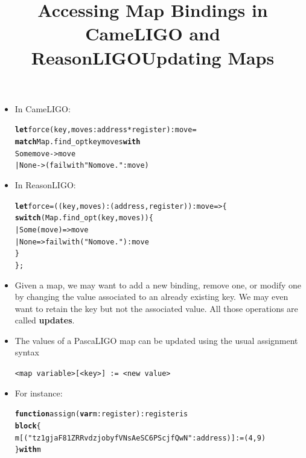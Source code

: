 \documentclass[wide]{slides}
\newcommand{\Kblock}[0]{\textbf{block}\xspace}
\newcommand{\Kfunction}[0]{\textbf{function}\xspace}
\newcommand{\Kvar}[0]{\textbf{var}\xspace}
\newcommand{\Kwith}[0]{\textbf{with}\xspace}
\newcommand{\Klet}[0]{\textbf{let}\xspace}
\newcommand{\Kmatch}[0]{\textbf{match}\xspace}
\newcommand{\Kswitch}[0]{\textbf{switch}\xspace}
\begin{document}
\begin{slide}
  \title{Accessing Map Bindings in CameLIGO and ReasonLIGO}

  \begin{itemize}

    \item In CameLIGO:
      \begin{alltt}
\Klet force (key, moves : address * register) : move =
  \Kmatch Map.find_opt key moves \Kwith
    Some move -> move
  | None -> (failwith "No move." : move)
      \end{alltt}

    \item In ReasonLIGO:
      \begin{alltt}
\Klet force = ((key, moves) : (address, register)) : move => \{
  \Kswitch (Map.find_opt (key, moves)) \{
  | Some (move) => move
  | None => failwith ("No move.") : move
  \}
\};
      \end{alltt}

  \end{itemize}

\end{slide}

\begin{slide}
  \title{Updating Maps}

  \begin{itemize}

    \item Given a map, we may want to add a new binding, remove one,
      or modify one by changing the value associated to an already
      existing key. We may even want to retain the key but not the
      associated value. All those operations are called
      \textbf{updates}.

    \item The values of a PascaLIGO map can be updated using the usual
      assignment syntax
      \begin{center}
        \texttt{<map variable>[<key>] := <new value>}
      \end{center}

    \item For instance:
      \begin{alltt}
\Kfunction assign (\Kvar m : register) : register is
  \Kblock \{
    m [("tz1gjaF81ZRRvdzjobyfVNsAeSC6PScjfQwN": address)] := (4,9)
  \} \Kwith m
      \end{alltt}

  \end{itemize}

\end{slide}
\end{document}
